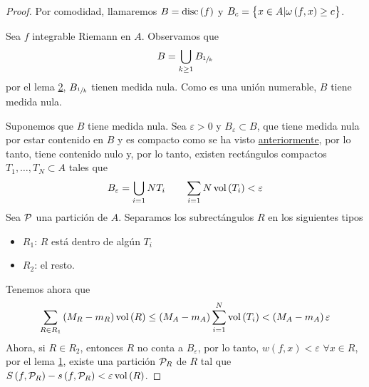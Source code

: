 \begin{proof}
    Por comodidad, llamaremos $B = \operatorname{disc}\left( f \right)$ y $B_c = \left\{x \in A
    \vert \omega\left( f, x \right) \geq c\right\}$.

    \bimplies

    Sea $f$ integrable Riemann en $A$. Observamos que
    \[
        B = \bigcup_{k \geq 1} B_{\sfrac{1}{k}}
    \]
    por el lema \hyperref[lema:dos_lebesgue]{2}, $B_{\sfrac{1}{k}}$ tienen medida
    nula. Como es una unión numerable, $B$ tiene medida nula.

    \bimpliedby

    Suponemos que $B$ tiene medida nula. Sea $\varepsilon > 0$ y $B_\varepsilon
    \subset B$, que tiene medida nula por estar contenido en $B$ y es compacto 
    como se ha visto \hyperref[col:lebesgue]{anteriormente}, por lo tanto, tiene contenido nulo y, por lo
    tanto, existen rectángulos compactos $T_1, \dots, T_N \subset A$ tales que
    \[
        B_\varepsilon = \bigcup_{i = 1}{N} T_i \qquad
        \sum_{i=1}{N}\operatorname{vol}\left( T_i \right) < \varepsilon
    \]
    Sea $\mathcal{P}$ una partición de $A$. Separamos los subrectángulos $R$ en los
    siguientes tipos
    \begin{itemize}
        \item $R_1$: $R$ está dentro de algún $T_i$
        \item $R_2$: el resto.
    \end{itemize}

    Tenemos ahora que
    \[
        \sum_{R \in R_1}\left( M_R - m_R \right)\operatorname{vol}\left( R \right) \leq
        \left( M_A -m_A \right)\sum^{N}_{i=1} \operatorname{vol}\left( T_i \right) <
        \left( M_A - m_A \right) \varepsilon
    \]
    Ahora, si $R \in R_2$, entonces $R$ no conta a $B_\varepsilon$, por lo tanto,
    $w(f,x) < \varepsilon$ $\forall x \in R$, por el lema
    \hyperref[lema:uno_lebesgue]{1}, existe una partición $\mathcal{P}_R$ de $R$ tal que
    $S\left( f, \mathcal{P}_R \right) - s\left( f, \mathcal{P}_R \right) < \varepsilon
    \operatorname{vol} \left( R \right)$.


\end{proof}
